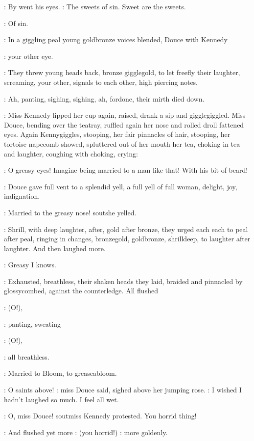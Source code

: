 :
By went his eyes.
\BloomInt:
The sweets of sin. Sweet are the sweets.

\BloomInt:
Of sin.

:
In a giggling peal young goldbronze voices blended, Douce with
Kennedy

\MissK:
your other eye.

:
They threw young heads back, bronze gigglegold,
to let freefly their laughter, screaming, your other,
signals to each
other,  high piercing notes.

:
Ah, panting, sighing, sighing, ah, fordone,
their mirth died down.

:
Miss Kennedy lipped her cup again, raised, drank a sip and
gigglegiggled. Miss Douce, bending over the teatray, ruffled again her
nose and rolled droll fattened eyes. Again Kennygiggles, stooping, her
fair pinnacles of hair, stooping, her tortoise napecomb showed, spluttered
out of her mouth her tea, choking in tea and laughter, coughing with
choking, crying:

\MissK:
O greasy eyes! Imagine being married to a man like that!
With his bit
of beard!

:
Douce gave full vent to a splendid yell, a full yell of full woman,
delight, joy, indignation.

\MissD:
Married to the greasy nose!
sout{she yelled.}

:
Shrill, with deep laughter, after, gold after bronze, they urged each
each to peal after peal, ringing in changes, bronzegold, goldbronze,
shrilldeep, to laughter after laughter. And then laughed more.

\MissK:
Greasy I knows.

:
Exhausted, breathless, their shaken heads they laid, braided and
pinnacled by glossycombed, against the counterledge. All flushed

\MissesDK:
(O!),

:
panting, sweating

\MissesDK:
(O!),

:
all breathless.

\MissK:
Married to Bloom,
to greaseabloom.

\MissD:
O saints above!
:
miss Douce said, sighed above her jumping rose.
\MissD:
I wished I hadn't laughed so much. I feel all wet.

\MissK:
O, miss Douce!
sout{miss Kennedy protested.}
You horrid thing!

:
And flushed yet more
\MissK:
(you horrid!)
:
more goldenly.

